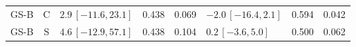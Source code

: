 \documentclass[10pt,a4paper]{article}
\begin{document}
\begin{longtable}{lcp{37mm}rrp{37mm}rr}
GS-B & C & \(2.9\,[-11.6,23.1]\) & 0.438 & 0.069 & \(-2.0\,[-16.4,2.1]\) & 0.594 & 0.042\\
GS-B & S & \(4.6\,[-12.9,57.1]\) & 0.438 & 0.104 & \(0.2\,[-3.6,5.0]\) & 0.500 & 0.062\\

\end{longtable}
\end{document}
